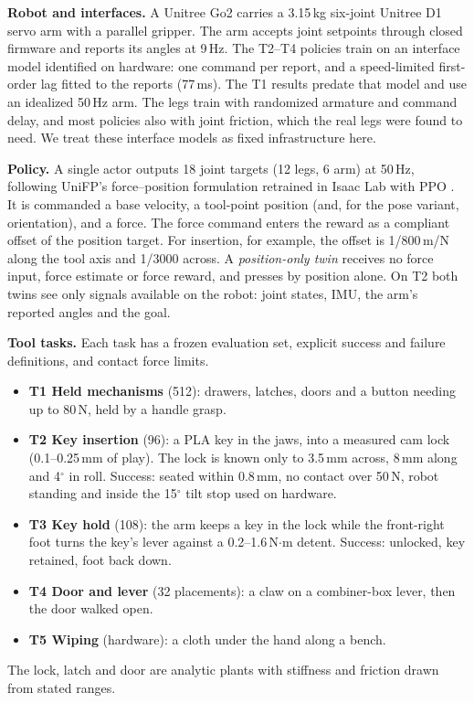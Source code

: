 \documentclass[conference]{IEEEtran}
\begin{document}
\textbf{Robot and interfaces.} A Unitree Go2 carries a 3.15\,kg six-joint Unitree D1 servo arm with a parallel gripper.
The arm accepts joint setpoints through closed firmware and reports its angles at 9\,Hz. The T2--T4 policies train on
an interface model identified on hardware: one command per report, and a speed-limited first-order lag fitted to the
reports (77\,ms). The T1 results predate that model and use an idealized 50\,Hz arm. The legs train with randomized
armature and command delay, and most policies also with joint friction, which the real legs were found to need. We treat
these interface models as fixed infrastructure here.

\textbf{Policy.} A single actor outputs 18 joint targets (12 legs, 6 arm) at 50\,Hz, following UniFP's force--position
formulation \citep{zhi2025unified} retrained in Isaac Lab \citep{mittal2023orbit} with PPO \citep{schulman2017proximal}.
It is commanded a base velocity, a tool-point position (and, for the pose variant, orientation), and a force. The force
command enters the reward as a compliant offset of the position target. For insertion, for example, the offset is
1/800\,m/N along the tool axis and 1/3000 across. A \emph{position-only twin} receives no force input, force estimate or
force reward, and presses by position alone. On T2 both twins see only signals available on the robot: joint states,
IMU, the arm's reported angles and the goal.

\textbf{Tool tasks.} Each task has a frozen evaluation set, explicit success and failure definitions, and contact force
limits.
\begin{itemize}
\item \textbf{T1 Held mechanisms} (512): drawers, latches, doors and a button needing up to 80\,N, held by a
handle grasp.
\item \textbf{T2 Key insertion} (96): a PLA key in the jaws, into a measured cam lock (0.1--0.25\,mm of play). The lock
is known only to 3.5\,mm across, 8\,mm along and 4$^\circ$ in roll. Success: seated within 0.8\,mm, no contact over 50\,N,
robot standing and inside the 15$^\circ$ tilt stop used on hardware.
\item \textbf{T3 Key hold} (108): the arm keeps a key in the lock while the front-right foot turns the key's lever
against a 0.2--1.6\,N$\cdot$m detent. Success: unlocked, key retained, foot back down.
\item \textbf{T4 Door and lever} (32 placements): a claw on a combiner-box lever, then the door walked open.
\item \textbf{T5 Wiping} (hardware): a cloth under the hand along a bench.
\end{itemize}
The lock, latch and door are analytic plants with stiffness and friction drawn from stated ranges.
\end{document}

